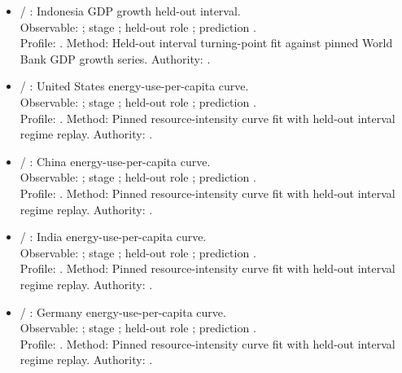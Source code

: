 \begin{itemize}
\item {} / : Indonesia GDP growth held-out interval.\\ Observable: ; stage ; held-out role ; prediction .\\ Profile: . Method: Held-out interval turning-point fit against pinned World Bank GDP growth series. Authority: .
\item {} / : United States energy-use-per-capita curve.\\ Observable: ; stage ; held-out role ; prediction .\\ Profile: . Method: Pinned resource-intensity curve fit with held-out interval regime replay. Authority: .
\item {} / : China energy-use-per-capita curve.\\ Observable: ; stage ; held-out role ; prediction .\\ Profile: . Method: Pinned resource-intensity curve fit with held-out interval regime replay. Authority: .
\item {} / : India energy-use-per-capita curve.\\ Observable: ; stage ; held-out role ; prediction .\\ Profile: . Method: Pinned resource-intensity curve fit with held-out interval regime replay. Authority: .
\item {} / : Germany energy-use-per-capita curve.\\ Observable: ; stage ; held-out role ; prediction .\\ Profile: . Method: Pinned resource-intensity curve fit with held-out interval regime replay. Authority: .

\end{itemize}
